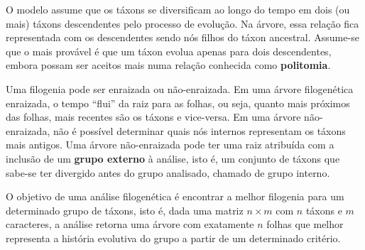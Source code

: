 \documentclass[12pt]{article}
\begin{document}

O modelo assume que os táxons se diversificam ao longo do tempo em dois (ou mais) táxons descendentes pelo processo de evolução. Na árvore, essa relação fica representada com os descendentes sendo nós filhos do táxon ancestral. Assume-se que o mais provável é que um táxon evolua apenas para dois descendentes, embora possam ser aceitos mais numa relação conhecida como \textbf{politomia}.

Uma filogenia pode ser enraizada ou não-enraizada. Em uma árvore filogenética enraizada, o tempo ``flui'' da raiz para as folhas, ou seja, quanto mais próximos das folhas, mais recentes são os táxons e vice-versa. Em uma árvore não-enraizada, não é possível determinar quais nós internos representam os táxons mais antigos. Uma árvore não-enraizada pode ter uma raiz atribuída com a inclusão de um \textbf{grupo externo} à análise, isto é, um conjunto de táxons que sabe-se ter divergido antes do grupo analisado, chamado de grupo interno.

O objetivo de uma análise filogenética é encontrar a melhor filogenia para um determinado grupo de táxons, isto é, dada uma matriz $n \times m$ com $n$ táxons e $m$ caracteres, a análise retorna uma árvore com exatamente $n$ folhas que melhor representa a história evolutiva do grupo a partir de um determinado critério.

\end{document}

